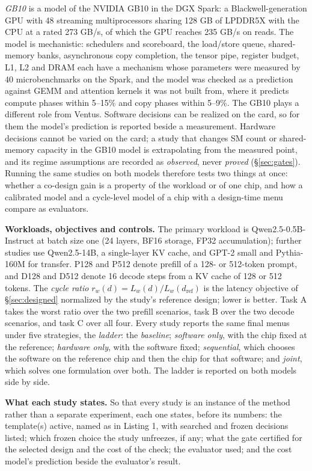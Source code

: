 \documentclass[11pt]{article}
\begin{document}
\emph{GB10} is a model of the NVIDIA GB10 in the DGX Spark: a Blackwell-generation GPU with 48 streaming multiprocessors sharing 128 GB of LPDDR5X with the CPU at a rated 273 GB/s, of which the GPU reaches 235 GB/s on reads. The model is mechanistic: schedulers and scoreboard, the load/store queue, shared-memory banks, asynchronous copy completion, the tensor pipe, register budget, L1, L2 and DRAM each have a mechanism whose parameters were measured by 40 microbenchmarks on the Spark, and the model was checked as a prediction against GEMM and attention kernels it was not built from, where it predicts compute phases within 5--15\% and copy phases within 5--9\%. The GB10 plays a different role from Ventus. Software decisions can be realized on the card, so for them the model's prediction is reported beside a measurement. Hardware decisions cannot be varied on the card; a study that changes SM count or shared-memory capacity in the GB10 model is extrapolating from the measured point, and its regime assumptions are recorded as \emph{observed}, never \emph{proved} (§\ref{sec:gates}). Running the same studies on both models therefore tests two things at once: whether a co-design gain is a property of the workload or of one chip, and how a calibrated model and a cycle-level model of a chip with a design-time menu compare as evaluators.

\textbf{Workloads, objectives and controls.} The primary workload is Qwen2.5-0.5B-Instruct \cite{r93} at batch size one (24 layers, BF16 storage, FP32 accumulation); further studies use Qwen2.5-14B, a single-layer KV cache, and GPT-2 small \cite{r94} and Pythia-160M \cite{r95} for transfer. P128 and P512 denote prefill of a 128- or 512-token prompt, and D128 and D512 denote 16 decode steps from a KV cache of 128 or 512 tokens. The \emph{cycle ratio} \(r_w(d)=L_w(d)/L_w(d_{\mathrm{ref}})\) is the latency objective of §\ref{sec:designed} normalized by the study's reference design; lower is better. Task A takes the worst ratio over the two prefill scenarios, task B over the two decode scenarios, and task C over all four. Every study reports the same final menus under five strategies, the \emph{ladder}: the \emph{baseline}; \emph{software only}, with the chip fixed at the reference; \emph{hardware only}, with the software fixed; \emph{sequential}, which chooses the software on the reference chip and then the chip for that software; and \emph{joint}, which solves one formulation over both. The ladder is reported on both models side by side.

\textbf{What each study states.} So that every study is an instance of the method rather than a separate experiment, each one states, before its numbers: the template(s) active, named as in Listing 1, with searched and frozen decisions listed; which frozen choice the study unfreezes, if any; what the gate certified for the selected design and the cost of the check; the evaluator used; and the cost model's prediction beside the evaluator's result.
\end{document}
